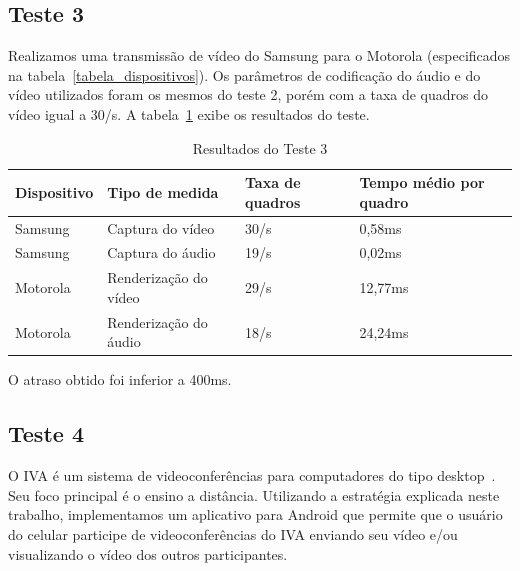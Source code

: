 \documentclass{acm_proc_article-sp}
\begin{document}
\subsection{Teste 3}
Realizamos uma transmissão de vídeo do Samsung para o Motorola (especificados na tabela~\ref{tabela_dispositivos}). Os parâmetros de codificação do áudio e do vídeo utilizados foram os mesmos do teste 2, porém com a taxa de quadros do vídeo igual a 30/s. A tabela~\ref{tabela_teste3} exibe os resultados do teste.
\begin{table}
\centering
\caption{Resultados do Teste 3}
\label{tabela_teste3}
\begin{tabular}{|p{1.5cm}|p{2.5cm}|p{1.2cm}|p{1.2cm}|} \hline
Dispositivo&Tipo de medida&Taxa de quadros&Tempo médio por quadro\\ \hline
Samsung&Captura do vídeo&30/s&0,58ms\\ \hline
Samsung&Captura do áudio&19/s&0,02ms\\ \hline
Motorola&Renderização do vídeo&29/s&12,77ms\\ \hline
Motorola&Renderização do áudio&18/s&24,24ms\\
\hline\end{tabular}
\end{table}
O atraso obtido foi inferior a 400ms.
\subsection{Teste 4}
O IVA é um sistema de videoconferências para computadores do tipo desktop~\cite{roesler_iva}. Seu foco principal é o ensino a distância. Utilizando a estratégia explicada neste trabalho, implementamos um aplicativo para Android que permite que o usuário do celular participe de videoconferências do IVA enviando seu vídeo e/ou visualizando o vídeo dos outros participantes.
\end{document}
